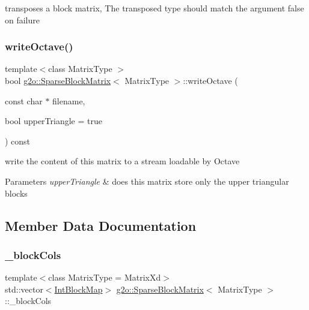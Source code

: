 transposes a block matrix, The transposed type should match the argument false on failure 

\mbox{\label{classg2o_1_1_sparse_block_matrix_a21725f29b3f1bbc4e4ba77ee3f960ddc}} 
\subsubsection{\texorpdfstring{write\+Octave()}{writeOctave()}}
{\footnotesize\ttfamily template$<$class Matrix\+Type $>$ \\
bool \mbox{\hyperlink{classg2o_1_1_sparse_block_matrix}{g2o\+::\+Sparse\+Block\+Matrix}}$<$ Matrix\+Type $>$\+::write\+Octave (\begin{DoxyParamCaption}\item[{const char $\ast$}]{filename,  }\item[{bool}]{upper\+Triangle = {\ttfamily true} }\end{DoxyParamCaption}) const}

write the content of this matrix to a stream loadable by Octave 
\begin{DoxyParams}{Parameters}
{\em upper\+Triangle} & does this matrix store only the upper triangular blocks \\
\hline
\end{DoxyParams}


\subsection{Member Data Documentation}
\mbox{\label{classg2o_1_1_sparse_block_matrix_ae236d56a01ba4d292450a518621b41f8}} 
\subsubsection{\texorpdfstring{\+\_\+block\+Cols}{\_blockCols}}
{\footnotesize\ttfamily template$<$class Matrix\+Type = Matrix\+Xd$>$ \\
std\+::vector$<$\mbox{\hyperlink{classg2o_1_1_sparse_block_matrix_aaa6ca1ae454ed70f62992b6401645f4e}{Int\+Block\+Map}}$>$ \mbox{\hyperlink{classg2o_1_1_sparse_block_matrix}{g2o\+::\+Sparse\+Block\+Matrix}}$<$ Matrix\+Type $>$\+::\+\_\+block\+Cols\hspace{0.3cm}{\ttfamily [protected]}}

